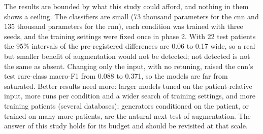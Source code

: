 The results are bounded by what this study could afford, and nothing in them shows a ceiling. The classifiers are small (73 thousand parameters for the cnn and 135 thousand parameters for the rnn), each condition was trained with three seeds, and the training settings were fixed once in phase 2. With 22 test patients the 95\% intervals of the pre-registered differences are 0.06 to 0.17 wide, so a real but smaller benefit of augmentation would not be detected; not detected is not the same as absent. Changing only the input, with no retuning, raised the cnn's test rare-class macro-F1 from 0.088 to 0.371, so the models are far from saturated. Better results need more: larger models tuned on the patient-relative input, more runs per condition and a wider search of training settings, and more training patients (several databases); generators conditioned on the patient, or trained on many more patients, are the natural next test of augmentation. The answer of this study holds for its budget and should be revisited at that scale.
